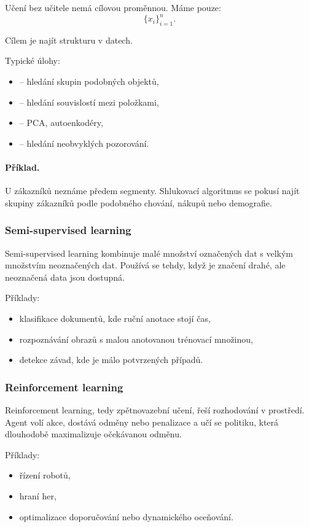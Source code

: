 Učení bez učitele nemá cílovou proměnnou. Máme pouze:
\[
\{x_i\}_{i=1}^n.
\]

Cílem je najít strukturu v datech.

Typické úlohy:
\begin{itemize}
    \item {} -- hledání skupin podobných objektů,
    \item {} -- hledání souvislostí mezi položkami,
    \item {} -- PCA, autoenkodéry,
    \item {} -- hledání neobvyklých pozorování.
\end{itemize}

\paragraph{Příklad.}
U zákazníků neznáme předem segmenty. Shlukovací algoritmus se pokusí najít skupiny zákazníků podle podobného
chování, nákupů nebo demografie.

\subsubsection{Semi-supervised learning}

Semi-supervised learning kombinuje malé množství označených dat s velkým množstvím neoznačených dat.
Používá se tehdy, když je značení drahé, ale neoznačená data jsou dostupná.

Příklady:
\begin{itemize}
    \item klasifikace dokumentů, kde ruční anotace stojí čas,
    \item rozpoznávání obrazů s malou anotovanou trénovací množinou,
    \item detekce závad, kde je málo potvrzených případů.
\end{itemize}

\subsubsection{Reinforcement learning}

Reinforcement learning, tedy zpětnovazební učení, řeší rozhodování v prostředí. Agent volí akce, dostává
odměny nebo penalizace a učí se politiku, která dlouhodobě maximalizuje očekávanou odměnu.

Příklady:
\begin{itemize}
    \item řízení robotů,
    \item hraní her,
    \item optimalizace doporučování nebo dynamického oceňování.
\end{itemize}


